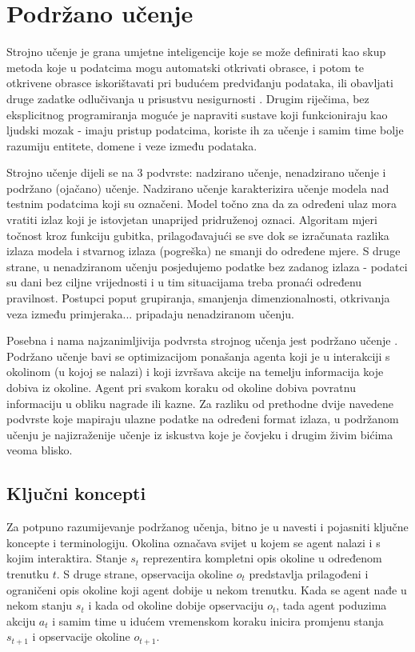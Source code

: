 \chapter{Podržano učenje}

Strojno učenje  je grana umjetne inteligencije  koje se može definirati kao skup metoda koje u podatcima mogu automatski otkrivati obrasce, i potom te otkrivene obrasce iskorištavati pri budućem predviđanju podataka, ili obavljati druge zadatke odlučivanja u prisustvu nesigurnosti \cite{CupicUvod}. Drugim riječima, bez eksplicitnog programiranja moguće je napraviti sustave koji funkcioniraju kao ljudski mozak - imaju pristup podatcima, koriste ih za učenje i samim time bolje razumiju entitete, domene i veze između podataka. 

Strojno učenje dijeli se na 3 podvrste: nadzirano učenje, nenadzirano učenje i podržano (ojačano) učenje. Nadzirano učenje  karakterizira učenje modela nad testnim podatcima koji su označeni. Model točno zna da za određeni ulaz mora vratiti izlaz koji je istovjetan unaprijed pridruženoj oznaci. Algoritam mjeri točnost kroz funkciju gubitka, prilagođavajući se sve dok se izračunata razlika izlaza modela i stvarnog izlaza (pogreška) ne smanji do određene mjere. S druge strane, u nenadziranom učenju  posjedujemo podatke bez zadanog izlaza - podatci su dani bez ciljne vrijednosti i u tim situacijama treba pronaći određenu pravilnost. Postupci poput grupiranja, smanjenja dimenzionalnosti, otkrivanja veza između primjeraka... pripadaju nenadziranom učenju.

Posebna i nama najzanimljivija podvrsta strojnog učenja jest podržano učenje . Podržano učenje bavi se optimizacijom ponašanja agenta koji je u interakciji s okolinom (u kojoj se nalazi) i koji izvršava akcije na temelju informacija koje dobiva iz okoline. Agent pri svakom koraku od okoline dobiva povratnu informaciju u obliku nagrade ili kazne. Za razliku od prethodne dvije navedene podvrste koje mapiraju ulazne podatke na određeni format izlaza, u podržanom učenju je najizraženije učenje iz iskustva koje je čovjeku i drugim živim bićima veoma blisko.

\section{Ključni koncepti}
\label{chap:kljucni-koncepti}

Za potpuno razumijevanje podržanog učenja, bitno je u navesti i pojasniti ključne koncepte i terminologiju. Okolina  označava svijet u kojem se agent nalazi i s kojim interaktira. Stanje $s_t$  reprezentira kompletni opis okoline u određenom trenutku $t$. S druge strane, opservacija okoline $o_t$  predstavlja prilagođeni i ograničeni opis okoline koji agent dobije u nekom trenutku. Kada se agent nađe u nekom stanju $s_t$ i kada od okoline dobije opservaciju $o_t$, tada agent poduzima akciju $a_t$  i samim time u idućem vremenskom koraku inicira promjenu stanja $s_{t+1}$ i opservacije okoline $o_{t+1}$. 

